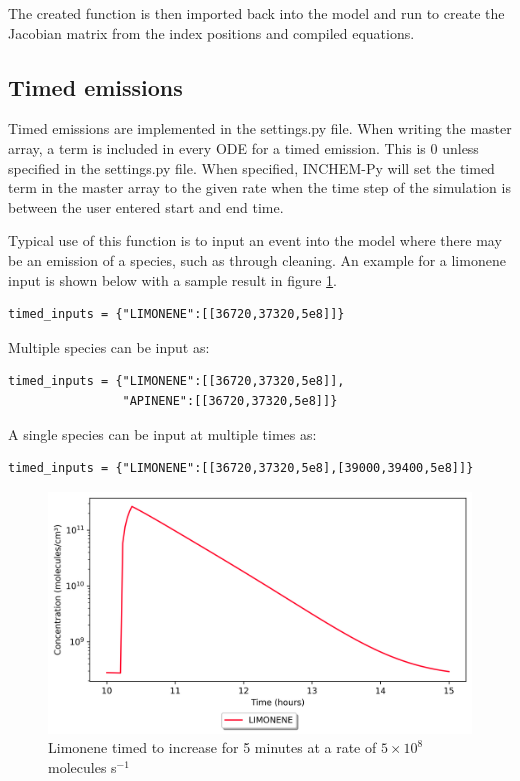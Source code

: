 \documentclass[a4paper]{refart}
\begin{document}
The created function is then imported back into the model and run to create the Jacobian matrix from the index positions and compiled equations.

\subsection{Timed emissions}\label{timed emissions, implementation}
Timed emissions are implemented in the settings.py file.  When writing the master array, a term is included in every ODE for a timed emission. This is 0 unless specified in the settings.py file. When specified, INCHEM-Py will set the timed term in the master array to the given rate when the time step of the simulation is between the user entered start and end time. 

Typical use of this function is to input an event into the model where there may be an emission of a species, such as through cleaning. An example for a limonene input is shown below with a sample result in figure \ref{fig:timed_limonene}. 

\begin{verbatim}
timed_inputs = {"LIMONENE":[[36720,37320,5e8]]}    
\end{verbatim}

Multiple species can be input as:
\begin{verbatim}
timed_inputs = {"LIMONENE":[[36720,37320,5e8]],
                "APINENE":[[36720,37320,5e8]]}
\end{verbatim}

A single species can be input at multiple times as:
\begin{verbatim}
timed_inputs = {"LIMONENE":[[36720,37320,5e8],[39000,39400,5e8]]} 
\end{verbatim}

\clearpage
\begin{figure}[h!]
    \centering
    \includegraphics[width=\textwidth]{timed_limonene.png}
    \caption{Limonene timed to increase for 5 minutes at a rate of $5\times10^8$ molecules s$^{-1}$}
    \label{fig:timed_limonene}
\end{figure}
\end{document}
